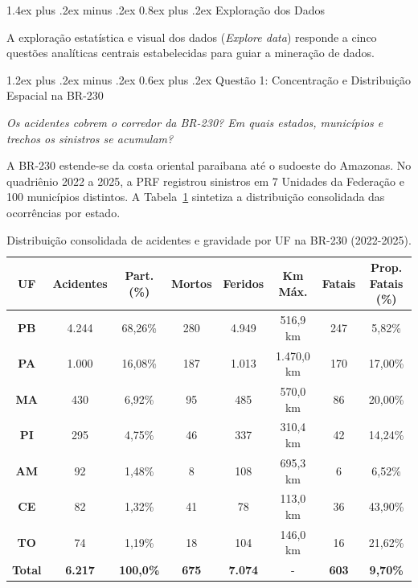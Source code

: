 \documentclass[11pt,a4paper]{article}
\makeatletter
\renewcommand\section{
\@startsection{section}{1}{0pt}%
{1.4ex plus .2ex minus .2ex}%
{0.8ex plus .2ex}%
{\normalfont\Large\bfseries\color{primary}}
}
\renewcommand\subsection{
\@startsection{subsection}{2}{0pt}%
{1.2ex plus .2ex minus .2ex}%
{0.6ex plus .2ex}%
{\normalfont\large\bfseries\color{secondary}}
}
\makeatother
\begin{document}
\newpage
\section{Exploração dos Dados}

A exploração estatística e visual dos dados (\textit{Explore data}) responde a cinco questões analíticas centrais estabelecidas para guiar a mineração de dados.

\subsection{Questão 1: Concentração e Distribuição Espacial na BR-230}

\textit{Os acidentes cobrem o corredor da BR-230? Em quais estados, municípios e trechos os sinistros se acumulam?}

A BR-230 estende-se da costa oriental paraibana até o sudoeste do Amazonas. No quadriênio 2022 a 2025, a PRF registrou sinistros em 7 Unidades da Federação e 100 municípios distintos. A Tabela~\ref{tab:uf_br230} sintetiza a distribuição consolidada das ocorrências por estado.

\begin{table}[H]
\centering
\small
\renewcommand{\arraystretch}{1.2}
\caption{Distribuição consolidada de acidentes e gravidade por UF na BR-230 (2022-2025).}
\label{tab:uf_br230}
\begin{tabularx}{\textwidth}{|c|c|c|c|c|c|c|c|}
\hline
\textbf{UF} & \textbf{Acidentes} & \textbf{Part. (\%)} & \textbf{Mortos} & \textbf{Feridos} & \textbf{Km Máx.} & \textbf{Fatais} & \textbf{Prop. Fatais (\%)} \\
\hline
\textbf{PB} & 4.244 & 68,26\% & 280 & 4.949 & 516,9 km & 247 & 5,82\% \\
\hline
\textbf{PA} & 1.000 & 16,08\% & 187 & 1.013 & 1.470,0 km & 170 & 17,00\% \\
\hline
\textbf{MA} & 430 & 6,92\% & 95 & 485 & 570,0 km & 86 & 20,00\% \\
\hline
\textbf{PI} & 295 & 4,75\% & 46 & 337 & 310,4 km & 42 & 14,24\% \\
\hline
\textbf{AM} & 92 & 1,48\% & 8 & 108 & 695,3 km & 6 & 6,52\% \\
\hline
\textbf{CE} & 82 & 1,32\% & 41 & 78 & 113,0 km & 36 & 43,90\% \\
\hline
\textbf{TO} & 74 & 1,19\% & 18 & 104 & 146,0 km & 16 & 21,62\% \\
\hline
\textbf{Total} & \textbf{6.217} & \textbf{100,0\%} & \textbf{675} & \textbf{7.074} & - & \textbf{603} & \textbf{9,70\%} \\
\hline
\end{tabularx}
\end{table}
\end{document}
